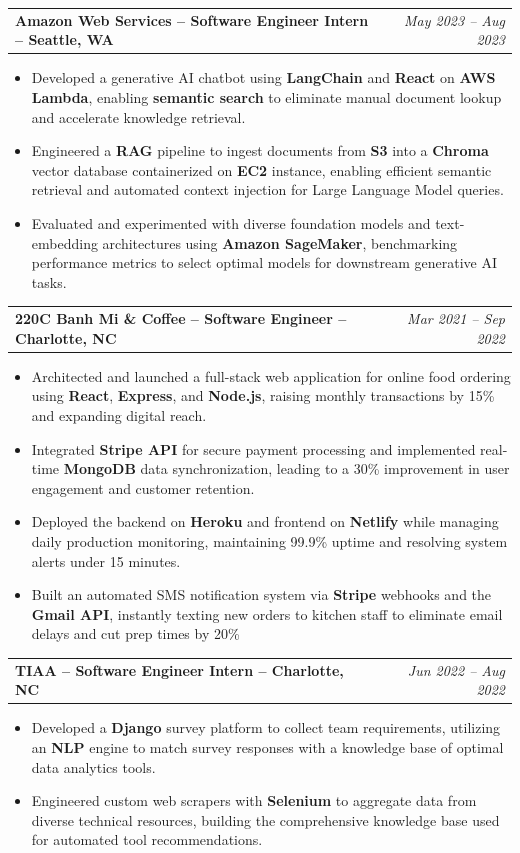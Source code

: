 \documentclass[letterpaper,11pt]{article}
\makeatletter
\newcommand{\resumeItem}[1]{
  \item\small{
    {#1 \vspace{-2pt}}
  }
}
\newcommand{\resumeSubheading}[4]{
  \vspace{-2pt}\item
    \begin{tabular*}{0.97\textwidth}[t]{l@{\extracolsep{\fill}}r}
      \textbf{#1 -- #2 -- #3} & \textit{\small #4} \\
    \end{tabular*}\vspace{-7pt}
}
\newcommand{\resumeItemListStart}{\begin{itemize}[label={-}]}
\newcommand{\resumeItemListEnd}{\end{itemize}\vspace{-5pt}}
\makeatother
\begin{document}
    \resumeSubheading
      {Amazon Web Services}{Software Engineer Intern}{Seattle, WA}{May 2023 -- Aug 2023}
        \resumeItemListStart
            \resumeItem{Developed a generative AI chatbot using \textbf{LangChain} and \textbf{React} on \textbf{AWS Lambda}, enabling \textbf{semantic search} to eliminate manual document lookup and accelerate knowledge retrieval.}
            \resumeItem{Engineered a \textbf{RAG} pipeline to ingest documents from \textbf{S3} into a \textbf{Chroma} vector database containerized on \textbf{EC2} instance, enabling efficient semantic retrieval and automated context injection for Large Language Model queries.}
            \resumeItem{Evaluated and experimented with diverse foundation models and text-embedding architectures using \textbf{Amazon SageMaker}, benchmarking performance metrics to select optimal models for downstream generative AI tasks.}
        \resumeItemListEnd

    \resumeSubheading
      {220C Banh Mi \& Coffee}{Software Engineer}{Charlotte, NC}{Mar 2021 -- Sep 2022}
      \resumeItemListStart
        \resumeItem{Architected and launched a full-stack web application for online food ordering using \textbf{React}, \textbf{Express}, and \textbf{Node.js}, raising monthly transactions by 15\% and expanding digital reach.}
        \resumeItem{Integrated \textbf{Stripe API} for secure payment processing and implemented real-time \textbf{MongoDB} data synchronization, leading to a 30\% improvement in user engagement and customer retention.}
        \resumeItem{Deployed the backend on \textbf{Heroku} and frontend on \textbf{Netlify} while managing daily production monitoring, maintaining 99.9\% uptime and resolving system alerts under 15 minutes.}
        \resumeItem{Built an automated SMS notification system via \textbf{Stripe} webhooks and the \textbf{Gmail API}, instantly texting new orders to kitchen staff to eliminate email delays and cut prep times by 20\%}
      \resumeItemListEnd

    \resumeSubheading
      {TIAA}{Software Engineer Intern}{Charlotte, NC}{Jun 2022 -- Aug 2022}
      \resumeItemListStart
        \resumeItem{Developed a \textbf{Django} survey platform to collect team requirements, utilizing an \textbf{NLP} engine to match survey responses with a knowledge base of optimal data analytics tools.}
        \resumeItem{Engineered custom web scrapers with \textbf{Selenium} to aggregate data from diverse technical resources, building the comprehensive knowledge base used for automated tool recommendations.}
    \resumeItemListEnd
    
\end{document}
